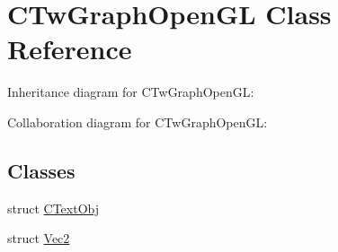 \hypertarget{class_c_tw_graph_open_g_l}{\section{C\+Tw\+Graph\+Open\+G\+L Class Reference}
\label{class_c_tw_graph_open_g_l}
}


Inheritance diagram for C\+Tw\+Graph\+Open\+G\+L\+:


Collaboration diagram for C\+Tw\+Graph\+Open\+G\+L\+:
\subsection*{Classes}
\begin{DoxyCompactItemize}
\item 
struct \hyperlink{struct_c_tw_graph_open_g_l_1_1_c_text_obj}{C\+Text\+Obj}
\item 
struct \hyperlink{struct_c_tw_graph_open_g_l_1_1_vec2}{Vec2}
\end{DoxyCompactItemize}
